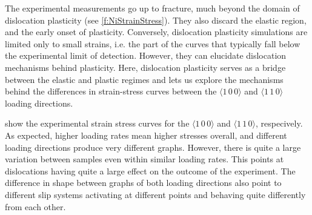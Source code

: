 The experimental measurements go up to fracture, much beyond the domain of dislocation plasticity (see \cref{f:NiStrainStress}). They also discard the elastic region, and the early onset of plasticity. Conversely, dislocation plasticity simulations are limited only to small strains, i.e. the part of the curves that typically fall below the experimental limit of detection. However, they can elucidate dislocation mechanisms behind plasticity. Here, dislocation plasticity serves as a bridge between the elastic and plastic regimes and lets us explore the mechanisms behind the differences in strain-stress curves between the $\langle 1\,0\,0 \rangle$ and $\langle 1\,1\,0 \rangle$ loading directions.

 show the experimental strain stress curves for the $\langle 1\,0\,0 \rangle$ and $\langle 1\,1\,0 \rangle$, respecively. As expected, higher loading rates mean higher stresses overall, and different loading directions produce very different graphs. However, there is quite a large variation between samples even within similar loading rates. This points at dislocations having quite a large effect on the outcome of the experiment. The difference in shape between graphs of both loading directions also point to different slip systems activating at different points and behaving quite differently from each other.

